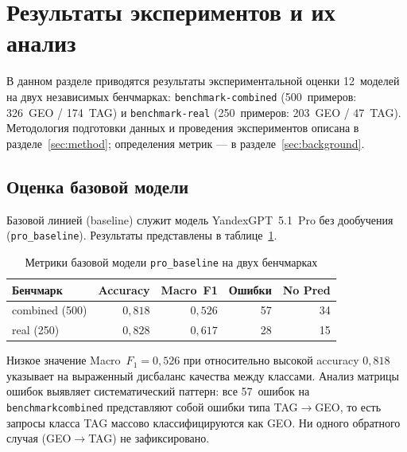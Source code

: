 
\section{Результаты экспериментов и их анализ} \label{sec:experiment}

В данном разделе приводятся результаты экспериментальной оценки 12~моделей на двух независимых бенчмарках: \texttt{benchmark-combined} (500~примеров: 326~GEO / 174~TAG) и \texttt{benchmark-real} (250~примеров: 203~GEO / 47~TAG). Методология подготовки данных и проведения экспериментов описана в разделе~\ref{sec:method}; определения метрик --- в разделе~\ref{sec:background}.

\subsection{Оценка базовой модели} \label{subsec:baseline}

Базовой линией (baseline) служит модель YandexGPT~5.1~Pro без дообучения (\texttt{pro\_baseline}). Результаты представлены в таблице~\ref{tab:baseline_results}.

\begin{table}[H]
\centering
\caption{Метрики базовой модели \texttt{pro\_baseline} на двух бенчмарках}
\label{tab:baseline_results}
\def\arraystretch{1.15}
\begin{tabular}{l r r r r}
    \toprule
    \textbf{Бенчмарк} & \textbf{Accuracy} & \textbf{Macro~F1} & \textbf{Ошибки} & \textbf{No Pred} \\
    \midrule
    combined (500) & $0{,}818$ & $0{,}526$ & 57 & 34 \\
    real (250)     & $0{,}828$ & $0{,}617$ & 28 & 15 \\
    \bottomrule
\end{tabular}
\end{table}

Низкое значение Macro~$F_1 = 0{,}526$ при относительно высокой accuracy $0{,}818$ указывает на выраженный дисбаланс качества между классами. Анализ матрицы ошибок выявляет систематический паттерн: все 57~ошибок на \texttt{benchmark\-combined} представляют собой ошибки типа TAG$\to$GEO, то есть запросы класса TAG массово классифицируются как GEO. Ни одного обратного случая (GEO$\to$TAG) не зафиксировано.

